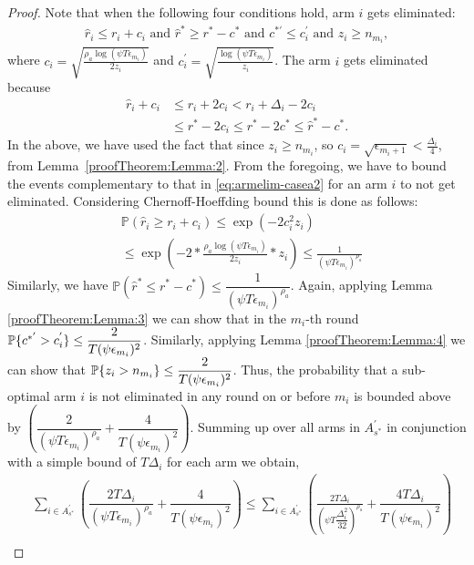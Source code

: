 \begin{proof}
Note that when the following four conditions hold, arm $i$ gets eliminated:
\begin{align}
\hat{r}_{i}  \le r_{i} + c_{i} \text{ and } 
 \hat{r}^{*}\geq  r^{*} - c^{*} \text{ and } c^{*'} \leq c_i^{'} \text{ and } z_i \geq n_{m_i}, \label{eq:armelim-casea2}
\end{align}
where  $c_{i} = \sqrt{\frac{\rho_{a}\log (\psi T\epsilon_{m_{i}})}{2 z_{i}}}$ and $c_{i}^{'} = \sqrt{\frac{\log (\psi T\epsilon_{m_{i}})}{ z_{i}}}$. The arm $i$ gets eliminated because 
  \begin{align*}
\hat{r}_{i} +c_{i} & \leq r_{i} + 2c_{i} < r_{i} + \Delta_{i} - 2c_{i}\\
 &\leq r^{*} -2c_{i} \leq r^{*} - 2c^* \leq \hat{r}^{*} - c^{*}  .
  \end{align*}
In the above, we have used the fact that since $z_i\geq n_{m_i}$, so $ c_{i} = \sqrt{\epsilon_{m_{i}+1}} < \frac{\Delta_{i}}{4}$, from Lemma~\ref{proofTheorem:Lemma:2}. From the foregoing, we have to bound the events complementary to that in \eqref{eq:armelim-casea2} for an arm $i$ to not get eliminated. Considering Chernoff-Hoeffding bound this is done as follows:
  \begin{align*}
&\mathbb{P}\left(\hat{r}_{i}\geq r_{i} + c_{i}\right)\leq \exp(-2c_{i}^{2}z_{i})\\
&\leq \exp(-2 * \frac{\rho_{a}\log (\psi T\epsilon_{m_{i}})}{2 z_{i}}*z_{i})
\leq \frac{1}{(\psi T\epsilon_{m_{i}})^{\rho_{a}}}   
  \end{align*}
Similarly, we have $\mathbb{P}\left(\hat{r}^{*}\leq r^{*} - c^{*}\right)\leq \dfrac{1}{(\psi  T\epsilon_{m_{i}})^{\rho_{a}}}$. Again, applying Lemma \ref{proofTheorem:Lemma:3} we can show that in the $m_i$-th round $\mathbb{P}\lbrace c^{*'} > c_i^{'} \rbrace \leq \dfrac{2}{T(\psi \epsilon_{m_i})^2}$. Similarly, applying Lemma \ref{proofTheorem:Lemma:4} we can show that $\mathbb{P}\lbrace z_i > n_{m_i} \rbrace \leq \dfrac{2}{T(\psi \epsilon_{m_i})^2}$. Thus, the probability that a sub-optimal arm $i$ is not eliminated in any round on or before $m_{i}$ is bounded above by $\left(\dfrac{2}{(\psi T\epsilon_{m_{i}})^{\rho_{a}}} + \dfrac{4}{T(\psi \epsilon_{m_i})^2}\right)$. Summing up over all arms in $A_{s^{*}}^{'}$ in conjunction with a simple bound of $T\Delta_{i}$ for each arm we obtain,
   \begin{align*}
&\sum_{i\in A_{s^{*}}^{'}}\left(\dfrac{2T\Delta_{i}}{(\psi T\epsilon_{m_{i}})^{\rho_{a}}} + \dfrac{4}{T(\psi \epsilon_{m_i})^2}\right)
\leq\sum_{i\in A_{s^{*}}^{'}}\left(\frac{2T\Delta_{i}}{(\psi T\dfrac{\Delta_{i}^{2}}{32})^{\rho_{a}}} +  \dfrac{4T\Delta_{i}}{T(\psi \epsilon_{m_i})^2}\right)\\

\end{align*}
\end{proof}
